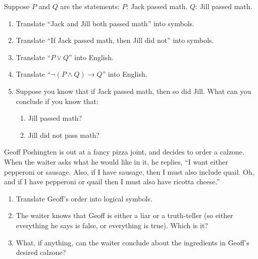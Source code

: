 \documentclass[11pt,]{book}
\theoremstyle{ptxplainnotitle}
\theoremstyle{ptxplaintitle}
\theoremstyle{ptxdefinitionnotitle}
\theoremstyle{ptxdefinitiontitle}
\theoremstyle{ptxdefinitionnotitle}
\theoremstyle{ptxdefinitiontitle}
\theoremstyle{ptxdefinitionnotitle}
\theoremstyle{ptxdefinitiontitle}
\theoremstyle{ptxdefinitiontitlenonumber}
\theoremstyle{ptxdefinitiontitlenonumber}
\numberwithin{equation}{chapter}
\newcommand{\imp}{\rightarrow}
\begin{document}
\begin{divisionexercise}{12}\hypertarget{exercise-160}{}
\hypertarget{p-2272}{}%
Suppose \(P\) and \(Q\) are the statements: \(P\): Jack passed math. \(Q\): Jill passed math. \leavevmode%
\begin{enumerate}[label=(\alph*)]
\item\hypertarget{li-1153}{}\hypertarget{p-2273}{}%
Translate ``Jack and Jill both passed math'' into symbols.%
\item\hypertarget{li-1154}{}\hypertarget{p-2274}{}%
Translate ``If Jack passed math, then Jill did not'' into symbols.%
\item\hypertarget{li-1155}{}\hypertarget{p-2275}{}%
Translate ``\(P \vee Q\)'' into English.%
\item\hypertarget{li-1156}{}\hypertarget{p-2276}{}%
Translate ``\(\neg(P \wedge Q) \imp Q\)'' into English.%
\item\hypertarget{li-1157}{}\hypertarget{p-2277}{}%
Suppose you know that if Jack passed math, then so did Jill.  What can you conclude if you know that: %
\begin{enumerate}[label=\roman*.]
\item\hypertarget{li-1158}{}Jill passed math?%
\item\hypertarget{li-1159}{}Jill did not pass math?%
\end{enumerate}
%
\end{enumerate}
%
\end{divisionexercise}%
\begin{divisionexercise}{13}\hypertarget{exercise-161}{}
\hypertarget{p-2282}{}%
Geoff Poshingten is out at a fancy pizza joint, and decides to order a calzone. When the waiter asks what he would like in it, he replies, ``I want either pepperoni or sausage. Also, if I have sausage, then I must also include quail. Oh, and if I have pepperoni or quail then I must also have ricotta cheese.'' \leavevmode%
\begin{enumerate}[label=(\alph*)]
\item\hypertarget{li-1167}{}\hypertarget{p-2283}{}%
Translate Geoff's order into logical symbols.%
\item\hypertarget{li-1168}{}\hypertarget{p-2284}{}%
The waiter knows that Geoff is either a liar or a truth-teller (so either everything he says is false, or everything is true).  Which is it?%
\item\hypertarget{li-1169}{}\hypertarget{p-2285}{}%
What, if anything, can the waiter conclude about the ingredients in Geoff's desired calzone?%
\end{enumerate}
%
\end{divisionexercise}%
\end{document}
